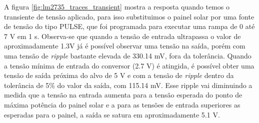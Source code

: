 \noindent
\begin{minipage}{\linewidth}
\label{fig:lm2735_transient}
\end{minipage}

\noindent
\begin{minipage}{\linewidth}
\label{fig:lm2735_traces_transient}
\end{minipage}

A figura \ref{fig:lm2735_traces_transient} mostra a resposta quando temos o transiente de tensão aplicado, para isso substituimos o painel solar por uma fonte de tensão do tipo PULSE, que foi programada para executar uma rampa de 0 até 7 V em 1 s. Observa-se que quando a tensão de entrada ultrapassa o valor de aproximadamente 1.3V já é possível observar uma tensão na saída, porém com uma tensão de \textit{ripple} bastante elevada de 330.14 mV, fora da tolerância. Quando a tensão mínima de entrada do conversor (2.7 V) é atingida, é possível obter uma tensão de saída próxima do alvo de 5 V e com a tensão de \textit{ripple} dentro da tolerância de 5\% do valor da saída, com 115.14 mV. Esse ripple vai diminuindo a medida que a tensão na entrada aumenta para a tensão esperada do ponto de máxima potência do painel solar e a para as tensões de entrada superiores as esperadas para o painel, a saída se satura em aproximadamente 5.1 V.

